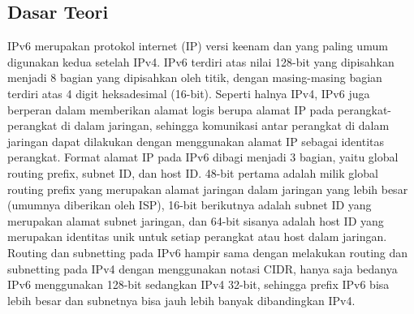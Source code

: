 \subsection{Dasar Teori}
\indent
IPv6 merupakan protokol internet (IP) versi keenam dan yang paling umum digunakan kedua setelah IPv4. IPv6 terdiri atas nilai 128-bit yang dipisahkan menjadi 8 bagian yang dipisahkan oleh titik, dengan masing-masing bagian terdiri atas 4 digit heksadesimal (16-bit). Seperti halnya IPv4, IPv6 juga berperan dalam memberikan alamat logis berupa alamat IP pada perangkat-perangkat di dalam jaringan, sehingga komunikasi antar perangkat di dalam jaringan dapat dilakukan dengan menggunakan alamat IP sebagai identitas perangkat. Format alamat IP pada IPv6 dibagi menjadi 3 bagian, yaitu global routing prefix, subnet ID, dan host ID. 48-bit pertama adalah milik global routing prefix yang merupakan alamat jaringan dalam jaringan yang lebih besar (umumnya diberikan oleh ISP), 16-bit berikutnya adalah subnet ID yang merupakan alamat subnet jaringan, dan 64-bit sisanya adalah host ID yang merupakan identitas unik untuk setiap perangkat atau host dalam jaringan. Routing dan subnetting pada IPv6 hampir sama dengan melakukan routing dan subnetting pada IPv4 dengan menggunakan notasi CIDR, hanya saja bedanya IPv6 menggunakan 128-bit sedangkan IPv4 32-bit, sehingga prefix IPv6 bisa lebih besar dan subnetnya bisa jauh lebih banyak dibandingkan IPv4.

